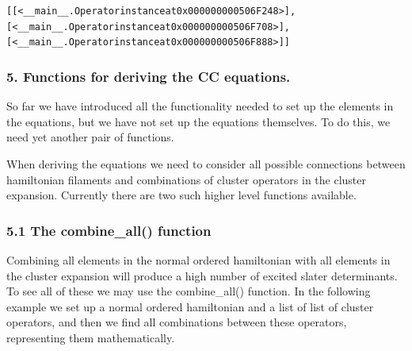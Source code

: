 \documentclass[letterpaper,10pt,english]{/Users/kinealicegulbrandsen/anaconda/lib/python2.7/site-packages/sphinx/texinputs/sphinxhowto}
\newenvironment{InvisibleVerbatim}
        {\begin{mdframed}[leftmargin=0.1\linewidth,innerleftmargin=3pt,innerrightmargin=3pt, userdefinedwidth=1\linewidth, linewidth=0pt, linecolor=white, usetwoside=false]}
        {\end{mdframed}}
\begin{document}
    

        
        

            
                \begin{InvisibleVerbatim}
                \vspace{-0.5\baselineskip}
\begin{alltt}[[<\_\_main\_\_.Operator instance at 0x000000000506F248>],
[<\_\_main\_\_.Operator instance at 0x000000000506F708>],
[<\_\_main\_\_.Operator instance at 0x000000000506F888>]]
\end{alltt}

            \end{InvisibleVerbatim}
            
        
    
\subsubsection{5. Functions for deriving the CC
equations.}\label{functions-for-deriving-the-cc-equations.}

So far we have introduced all the functionality needed to set up the
elements in the equations, but we have not set up the equations
themselves. To do this, we need yet another pair of functions.

When deriving the equations we need to consider all possible connections
between hamiltonian filaments and combinations of cluster operators in
the cluster expansion. Currently there are two such higher level
functions available.\subsubsection{5.1 The combine\_all()
function}\label{the-combineux5fall-function}

Combining all elements in the normal ordered hamiltonian with all
elements in the cluster expansion will produce a high number of excited
slater determinants. To see all of these we may use the combine\_all()
function. In the following example we set up a normal ordered
hamiltonian and a list of list of cluster operators, and then we find
all combinations between these operators, representing them
mathematically.

\end{document}
